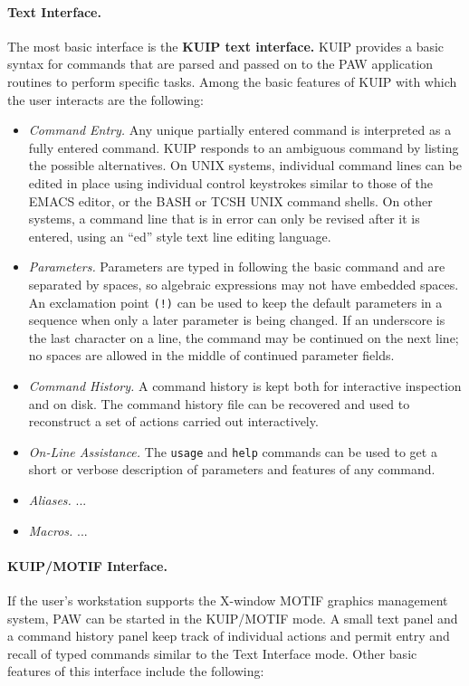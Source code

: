 \paragraph{Text Interface.}  The most basic
interface is the {\bf KUIP text interface.}  KUIP provides
a basic syntax for commands that are parsed and passed on
to the PAW application routines to perform specific tasks.
Among the basic features of KUIP with which the user
interacts are the following:
 
\begin{itemize}
\item {\it Command Entry.\/}  Any unique partially entered command
is interpreted as a fully entered command.  KUIP
responds to an ambiguous command by listing the possible
alternatives.
On UNIX systems, individual
command lines can be  edited in place using individual
control keystrokes similar to those of the EMACS editor, or the
BASH or TCSH UNIX command shells.  On other systems, a
command line that is in error can only be revised after
it is entered, using an ``ed'' style text line editing
language.
\item {\it Parameters.\/}
Parameters are typed in following the basic command and
are separated by spaces, so algebraic expressions may not
have embedded spaces.  An exclamation point {\tt (!)} can
be used to keep the default parameters in a sequence when
only a later parameter is being changed.  If an underscore
\Lit{(_)} is the last character on a line, the command
may be continued on the next line; no spaces are allowed in
the middle of continued parameter fields.
\item {\it Command History.\/}  A command history is kept
both for interactive inspection and on disk.  The command
history file can be recovered and used to reconstruct
a set of actions carried out interactively.
\item {\it On-Line Assistance.\/}  The \verb|usage| and
\verb|help| commands can be used to get a short or verbose
description of  parameters and features of any command.
\item {\it Aliases.\/} ...
\item {\it Macros.\/} ...
\end{itemize}
 
\paragraph{KUIP/MOTIF Interface.}  If the user's workstation
supports the X-window MOTIF graphics management system, PAW can be
started in the KUIP/MOTIF mode.  A small text panel and a command
history panel keep track of individual actions and permit entry and
recall of typed commands similar to the Text Interface mode.  Other
basic features of this interface include the following:
 

